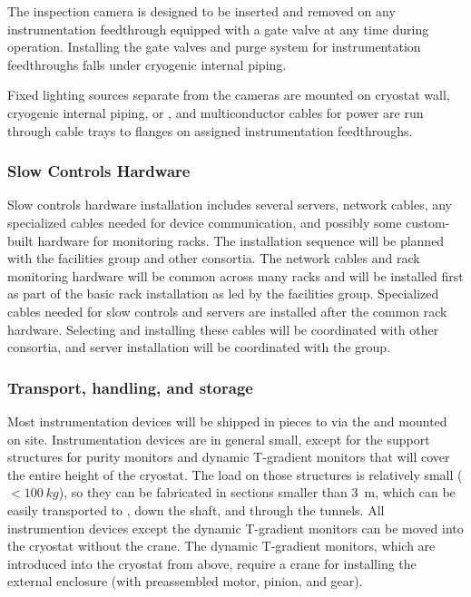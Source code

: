 The inspection camera is designed to be inserted and removed on any
instrumentation feedthrough equipped with a gate valve at any time
during operation.  Installing the gate valves and purge system
for instrumentation feedthroughs falls under cryogenic internal
piping.

Fixed lighting sources separate from the cameras
are mounted on cryostat wall, cryogenic internal piping, or
, and multiconductor cables for power are run through cable
trays to flanges on assigned instrumentation feedthroughs.



\subsubsection{Slow Controls Hardware}
\label{sec:fdgen-slow-cryo-install-sc-hard}

Slow controls hardware installation %
includes several
servers, network cables, any specialized cables needed
for device communication, and possibly some custom-built hardware for monitoring racks. The installation sequence will be 
planned with the facilities group and other consortia. The network
cables and rack monitoring hardware will be common across many racks
and will be installed first as part of the basic rack installation as %
led by the facilities group. Specialized cables needed for slow controls and servers %
are installed
after the common rack hardware. Selecting and installing these cables will be coordinated
with other consortia, and server installation will be coordinated with the  group.

\subsubsection{Transport, handling, and storage}
\label{sec:fdgen-slow-cryo-install-transport}


Most instrumentation devices will be shipped in pieces to \surf via the  and mounted on site. 
Instrumentation devices are in general small, except for
the support structures for purity monitors and dynamic T-gradient monitors
that will cover the entire height of the cryostat. The load on those structures is relatively small (\(<\SI{100}{kg}\)), so they can be fabricated in sections smaller than \SI{3}{m},
which can be easily transported to \surf, down the shaft, and through the tunnels.
All instrumention devices except the dynamic T-gradient monitors can be moved into the cryostat without the crane. The dynamic T-gradient monitors, which %
are introduced into the cryostat from above, %
require a crane for installing  the external enclosure (with preassembled motor, pinion, and gear). %


